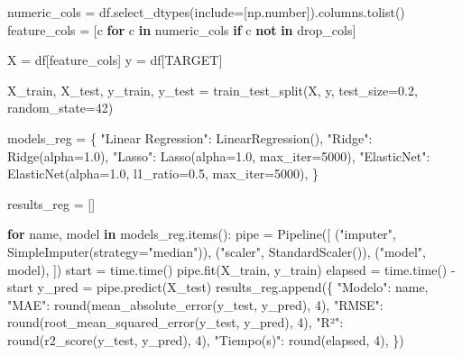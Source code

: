 \documentclass[
  letterpaper,
  DIV=11,
  numbers=noendperiod]{scrartcl}
\newenvironment{Shaded}{\begin{snugshade}}{\end{snugshade}}
\newcommand{\BuiltInTok}[1]{\textcolor[rgb]{0.00,0.23,0.31}{#1}}
\newcommand{\ControlFlowTok}[1]{\textcolor[rgb]{0.00,0.23,0.31}{\textbf{#1}}}
\newcommand{\DecValTok}[1]{\textcolor[rgb]{0.68,0.00,0.00}{#1}}
\newcommand{\FloatTok}[1]{\textcolor[rgb]{0.68,0.00,0.00}{#1}}
\newcommand{\KeywordTok}[1]{\textcolor[rgb]{0.00,0.23,0.31}{\textbf{#1}}}
\newcommand{\NormalTok}[1]{\textcolor[rgb]{0.00,0.23,0.31}{#1}}
\newcommand{\OperatorTok}[1]{\textcolor[rgb]{0.37,0.37,0.37}{#1}}
\newcommand{\StringTok}[1]{\textcolor[rgb]{0.13,0.47,0.30}{#1}}
\begin{document}
\begin{Shaded}
\begin{Highlighting}[]
\NormalTok{numeric\_cols }\OperatorTok{=}\NormalTok{ df.select\_dtypes(include}\OperatorTok{=}\NormalTok{[np.number]).columns.tolist()}
\NormalTok{feature\_cols }\OperatorTok{=}\NormalTok{ [c }\ControlFlowTok{for}\NormalTok{ c }\KeywordTok{in}\NormalTok{ numeric\_cols }\ControlFlowTok{if}\NormalTok{ c }\KeywordTok{not} \KeywordTok{in}\NormalTok{ drop\_cols]}

\NormalTok{X }\OperatorTok{=}\NormalTok{ df[feature\_cols]}
\NormalTok{y }\OperatorTok{=}\NormalTok{ df[TARGET]}

\NormalTok{X\_train, X\_test, y\_train, y\_test }\OperatorTok{=}\NormalTok{ train\_test\_split(X, y, test\_size}\OperatorTok{=}\FloatTok{0.2}\NormalTok{, random\_state}\OperatorTok{=}\DecValTok{42}\NormalTok{)}

\NormalTok{models\_reg }\OperatorTok{=}\NormalTok{ \{}
    \StringTok{"Linear Regression"}\NormalTok{: LinearRegression(),}
    \StringTok{"Ridge"}\NormalTok{:             Ridge(alpha}\OperatorTok{=}\FloatTok{1.0}\NormalTok{),}
    \StringTok{"Lasso"}\NormalTok{:             Lasso(alpha}\OperatorTok{=}\FloatTok{1.0}\NormalTok{, max\_iter}\OperatorTok{=}\DecValTok{5000}\NormalTok{),}
    \StringTok{"ElasticNet"}\NormalTok{:        ElasticNet(alpha}\OperatorTok{=}\FloatTok{1.0}\NormalTok{, l1\_ratio}\OperatorTok{=}\FloatTok{0.5}\NormalTok{, max\_iter}\OperatorTok{=}\DecValTok{5000}\NormalTok{),}
\NormalTok{\}}

\NormalTok{results\_reg }\OperatorTok{=}\NormalTok{ []}

\ControlFlowTok{for}\NormalTok{ name, model }\KeywordTok{in}\NormalTok{ models\_reg.items():}
\NormalTok{    pipe }\OperatorTok{=}\NormalTok{ Pipeline([}
\NormalTok{        (}\StringTok{"imputer"}\NormalTok{, SimpleImputer(strategy}\OperatorTok{=}\StringTok{"median"}\NormalTok{)),}
\NormalTok{        (}\StringTok{"scaler"}\NormalTok{,  StandardScaler()),}
\NormalTok{        (}\StringTok{"model"}\NormalTok{,   model),}
\NormalTok{    ])}
\NormalTok{    start }\OperatorTok{=}\NormalTok{ time.time()}
\NormalTok{    pipe.fit(X\_train, y\_train)}
\NormalTok{    elapsed }\OperatorTok{=}\NormalTok{ time.time() }\OperatorTok{{-}}\NormalTok{ start}
\NormalTok{    y\_pred }\OperatorTok{=}\NormalTok{ pipe.predict(X\_test)}
\NormalTok{    results\_reg.append(\{}
        \StringTok{"Modelo"}\NormalTok{:    name,}
        \StringTok{"MAE"}\NormalTok{:       }\BuiltInTok{round}\NormalTok{(mean\_absolute\_error(y\_test, y\_pred), }\DecValTok{4}\NormalTok{),}
        \StringTok{"RMSE"}\NormalTok{:      }\BuiltInTok{round}\NormalTok{(root\_mean\_squared\_error(y\_test, y\_pred), }\DecValTok{4}\NormalTok{),}
        \StringTok{"R²"}\NormalTok{:        }\BuiltInTok{round}\NormalTok{(r2\_score(y\_test, y\_pred), }\DecValTok{4}\NormalTok{),}
        \StringTok{"Tiempo(s)"}\NormalTok{: }\BuiltInTok{round}\NormalTok{(elapsed, }\DecValTok{4}\NormalTok{),}
\NormalTok{    \})}


\end{Highlighting}
\end{Shaded}
\end{document}
